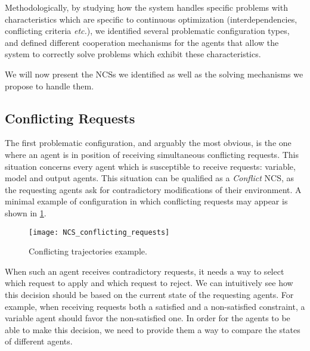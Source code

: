 Methodologically, by studying how the system handles specific problems with characteristics which are specific to continuous optimization (interdependencies, conflicting criteria \emph{etc.}), we identified several problematic configuration types, and defined different cooperation mechanisms for the agents that allow the system to correctly solve problems which exhibit these characteristics.

We will now present the NCSs we identified as well as the solving mechanisms we propose to handle them.

\subsection{Conflicting Requests}\label{conflicting_requests_mechanism}

The first problematic configuration, and arguably the most obvious, is the one where an agent is in position of receiving simultaneous conflicting requests. This situation concerns every agent which is susceptible to receive requests: variable, model and output agents. This situation can be qualified as a \emph{Conflict} NCS, as the requesting agents ask for contradictory modifications of their environment. A minimal example of configuration in which conflicting requests may appear is shown in \figurename{} \ref{NCS_conflicting_requests}.

\begin{figure}
\centering
\texttt{[image: NCS\_conflicting\_requests]}
\caption{Conflicting trajectories example.}\label{NCS_conflicting_requests}
\end{figure}

When such an agent receives contradictory requests, it needs a way to select which request to apply and which request to reject. We can intuitively see how this decision should be based on the current state of the requesting agents. For example, when receiving requests both a satisfied and a non-satisfied constraint, a variable agent should favor the non-satisfied one. In order for the agents to be able to make this decision, we need to provide them a way to compare the states of different agents.

